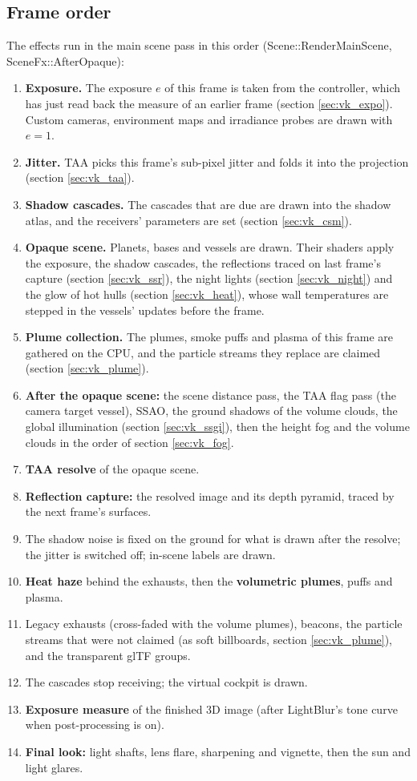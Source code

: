 \documentclass[Orbiter Technical Reference.tex]{subfiles}
\begin{document}
\begin{sloppypar}
\subsection{Frame order}\label{sec:vk_order}
The effects run in the main scene pass in this order (Scene::RenderMainScene, SceneFx::AfterOpaque):

\begin{enumerate}
\item \textbf{Exposure.} The exposure $e$ of this frame is taken from the controller, which has just read back the measure of an earlier frame (section \ref{sec:vk_expo}). Custom cameras, environment maps and irradiance probes are drawn with $e = 1$.
\item \textbf{Jitter.} TAA picks this frame's sub-pixel jitter and folds it into the projection (section \ref{sec:vk_taa}).
\item \textbf{Shadow cascades.} The cascades that are due are drawn into the shadow atlas, and the receivers' parameters are set (section \ref{sec:vk_csm}).
\item \textbf{Opaque scene.} Planets, bases and vessels are drawn. Their shaders apply the exposure, the shadow cascades, the reflections traced on last frame's capture (section \ref{sec:vk_ssr}), the night lights (section \ref{sec:vk_night}) and the glow of hot hulls (section \ref{sec:vk_heat}), whose wall temperatures are stepped in the vessels' updates before the frame.
\item \textbf{Plume collection.} The plumes, smoke puffs and plasma of this frame are gathered on the CPU, and the particle streams they replace are claimed (section \ref{sec:vk_plume}).
\item \textbf{After the opaque scene:} the scene distance pass, the TAA flag pass (the camera target vessel), SSAO, the ground shadows of the volume clouds, the global illumination (section \ref{sec:vk_ssgi}), then the height fog and the volume clouds in the order of section \ref{sec:vk_fog}.
\item \textbf{TAA resolve} of the opaque scene.
\item \textbf{Reflection capture:} the resolved image and its depth pyramid, traced by the next frame's surfaces.
\item The shadow noise is fixed on the ground for what is drawn after the resolve; the jitter is switched off; in-scene labels are drawn.
\item \textbf{Heat haze} behind the exhausts, then the \textbf{volumetric plumes}, puffs and plasma.
\item Legacy exhausts (cross-faded with the volume plumes), beacons, the particle streams that were not claimed (as soft billboards, section \ref{sec:vk_plume}), and the transparent glTF groups.
\item The cascades stop receiving; the virtual cockpit is drawn.
\item \textbf{Exposure measure} of the finished 3D image (after LightBlur's tone curve when post-processing is on).
\item \textbf{Final look:} light shafts, lens flare, sharpening and vignette, then the sun and light glares.
\end{enumerate}


\end{sloppypar}
\end{document}
